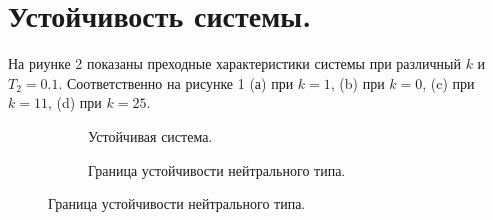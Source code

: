 \documentclass[a4paper, 11pt]{article}
\begin{document}
\section*{Устойчивость системы.}
На риунке 2 показаны преходные характеристики системы при различный $k$ и $T_2 = 0.1$. Соответственно на рисунке 1 (а) при $k = 1$, (b) при $k = 0$, (c) при $k = 11$, (d) при $k = 25$.
\begin{figure}[h!]
    \begin{subfigure}[b]{0.5\textwidth} 
        \centering
        \caption{Устойчивая система.}
    \end{subfigure}
    \begin{subfigure}[b]{0.5\textwidth} 
        \centering
       \caption{Граница устойчивости нейтрального типа.}
    \end{subfigure}

    \vspace{0.5cm} 


\end{figure}
\end{document}
